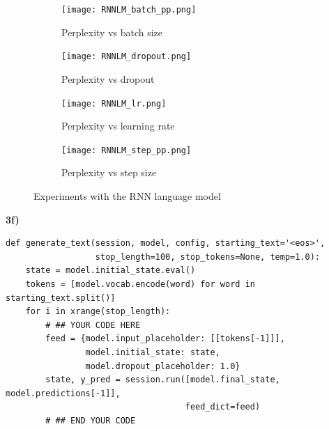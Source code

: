 \documentclass{article}
\begin{document}
\begin{figure}[H] 
  \begin{subfigure}[b]{0.5\linewidth}
    \centering
    \texttt{[image: RNNLM\_batch\_pp.png]} 
    \caption{Perplexity vs batch size} 
    \label{rnn_batch} 
    \vspace{4ex}
  \end{subfigure}%
  \begin{subfigure}[b]{0.5\linewidth}
    \centering
    \texttt{[image: RNNLM\_dropout.png]} 
    \caption{Perplexity vs dropout} 
    \label{rnn_dropout} 
    \vspace{4ex}
  \end{subfigure} 
  \begin{subfigure}[b]{0.5\linewidth}
    \centering
    \texttt{[image: RNNLM\_lr.png]} 
    \caption{Perplexity vs learning rate} 
    \label{rnn_lr} 
  \end{subfigure}%
  \begin{subfigure}[b]{0.5\linewidth}
    \centering
    \texttt{[image: RNNLM\_step\_pp.png]} 
    \caption{Perplexity vs step size} 
    \label{rnn_step} 
  \end{subfigure} 
  \caption{Experiments with the RNN language model}
  \label{RNN_e} 
\end{figure}

\textbf{3f)}

\begin{verbatim}
def generate_text(session, model, config, starting_text='<eos>',
                  stop_length=100, stop_tokens=None, temp=1.0):
    state = model.initial_state.eval()
    tokens = [model.vocab.encode(word) for word in starting_text.split()]
    for i in xrange(stop_length):
        # ## YOUR CODE HERE
        feed = {model.input_placeholder: [[tokens[-1]]],
                model.initial_state: state,
                model.dropout_placeholder: 1.0}
        state, y_pred = session.run([model.final_state, model.predictions[-1]],
                                    feed_dict=feed)
        # ## END YOUR CODE
\end{verbatim}
\end{document}
